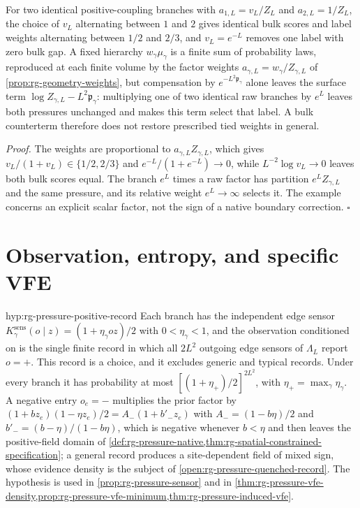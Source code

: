 For two identical positive-coupling branches with $a_{1,L}=v_L/Z_L$ and
$a_{2,L}=1/Z_L$, the choice of $v_L$ alternating between $1$ and $2$ gives
identical bulk scores and label weights alternating between $1/2$ and $2/3$,
and $v_L=e^{-L}$ removes one label with zero bulk gap. A fixed hierarchy
$w_\gamma\mu_\gamma$ is a finite sum of probability laws, reproduced at each
finite volume by the factor weights $a_{\gamma,L}=w_\gamma/Z_{\gamma,L}$ of
\cref{prop:rg-geometry-weights}, but compensation by
$e^{-L^2\mathfrak p_\gamma}$ alone leaves the surface term
$\log Z_{\gamma,L}-L^2\mathfrak p_\gamma$: multiplying one of two identical
raw branches by $e^L$ leaves both pressures unchanged and makes this term
select that label. A bulk counterterm therefore does not restore prescribed
tied weights in general. 

\noindent\emph{Proof.}
The weights are proportional to $a_{\gamma,L}Z_{\gamma,L}$, which gives
$v_L/(1+v_L)\in\{1/2,2/3\}$ and $e^{-L}/(1+e^{-L})\to0$, while
$L^{-2}\log v_L\to0$ leaves both bulk scores equal. The branch $e^L$ times a
raw factor has partition $e^LZ_{\gamma,L}$ and the same pressure, and its
relative weight $e^L\to\infty$ selects it. The example concerns an explicit
scalar factor, not the sign of a native boundary correction. $\square$

\section{Observation, entropy, and specific VFE}
\label{sec:rg-pressure-vfe}

{hyp:rg-pressure-positive-record}
Each branch has the independent edge sensor
$K^{\mathrm{sens}}_\gamma(o\mid z)=(1+\eta_\gamma oz)/2$ with
$0<\eta_\gamma<1$, and the observation conditioned on is the single finite
record in which all $2L^2$ outgoing edge sensors of $\Lambda_L$ report
$o=+$. This record is a choice, and it excludes generic and typical records.
Under every branch it has probability at most
$[(1+\eta_+)/2]^{2L^2}$, with $\eta_+=\max_\gamma\eta_\gamma$. A negative entry
$o_e=-$ multiplies the prior factor by
$(1+bz_e)(1-\eta z_e)/2=A_-(1+b'_-z_e)$ with $A_-=(1-b\eta)/2$ and
$b'_-=(b-\eta)/(1-b\eta)$, which is negative whenever $b<\eta$ and then
leaves the positive-field domain of
\cref{def:rg-pressure-native,thm:rg-spatial-constrained-specification}; a
general record produces a site-dependent field of mixed sign, whose evidence
density is the subject of \cref{open:rg-pressure-quenched-record}. The
hypothesis is used in \cref{prop:rg-pressure-sensor} and in
\cref{thm:rg-pressure-vfe-density,prop:rg-pressure-vfe-minimum,thm:rg-pressure-induced-vfe}.

